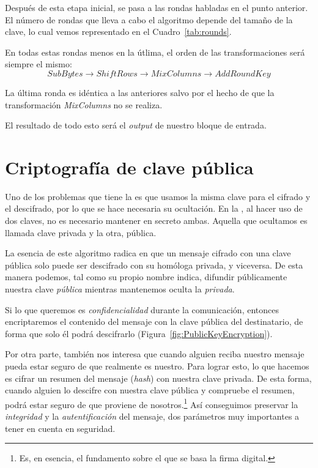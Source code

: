 Después de esta etapa inicial, se pasa a las rondas habladas en el punto anterior.
El número de rondas que lleva a cabo el algoritmo depende del tamaño de la clave,
lo cual vemos representado en el Cuadro~\ref{tab:rounds}.

En todas estas rondas menos en la útlima, el orden de las transformaciones será siempre el mismo:
\[ SubBytes \rightarrow ShiftRows \rightarrow MixColumns \rightarrow AddRoundKey \]

La última ronda es idéntica a las anteriores salvo por el hecho de que la transformación \emph{MixColumns} no se realiza.

El resultado de todo esto será el \emph{output} de nuestro bloque de entrada. \emph{\parencite{Reference26}}


\section{Criptografía de clave pública}

Uno de los problemas que tiene la  es que usamos la misma clave para el cifrado y el descifrado, por lo que se hace necesaria su ocultación.
En la , al hacer uso de dos claves, no es necesario mantener en secreto ambas. Aquella que ocultamos es llamada clave privada y la otra, pública.

La esencia de este algoritmo radica en que un mensaje cifrado con una clave pública solo puede ser descifrado con su homóloga privada, y viceversa.
De esta manera podemos, tal como su propio nombre indica, difundir públicamente nuestra clave \emph{pública} mientras mantenemos oculta la \emph{privada}.

Si lo que queremos es \emph{confidencialidad} durante la comunicación, entonces encriptaremos el contenido del mensaje con la clave pública del destinatario, de forma que solo él podrá descifrarlo (Figura~\ref{fig:PublicKeyEncryption}).

Por otra parte, también nos interesa que cuando alguien reciba nuestro mensaje pueda estar seguro de que realmente es nuestro.
Para lograr esto, lo que hacemos es cifrar un resumen del mensaje (\emph{hash}) con nuestra clave privada.
De esta forma, cuando alguien lo descifre con nuestra clave pública y compruebe el resumen, podrá estar seguro de que proviene de nosotros.\footnote{Es, en esencia, el fundamento sobre el que se basa la firma digital.}
Así conseguimos preservar la \emph{integridad} y la \emph{autentificación} del mensaje, dos parámetros muy importantes a tener en cuenta en seguridad. \emph{\parencite{Reference14}}

